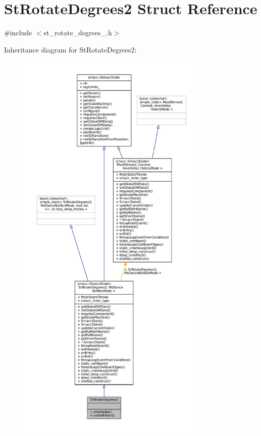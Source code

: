 \hypertarget{structStRotateDegrees2}{}\section{St\+Rotate\+Degrees2 Struct Reference}
\label{structStRotateDegrees2}


{\ttfamily \#include $<$st\+\_\+rotate\+\_\+degrees\+\_.\+h$>$}



Inheritance diagram for St\+Rotate\+Degrees2\+:
\nopagebreak
\begin{figure}[H]
\begin{center}
\leavevmode
\includegraphics[height=550pt]{structStRotateDegrees2__inherit__graph}
\end{center}
\end{figure}



